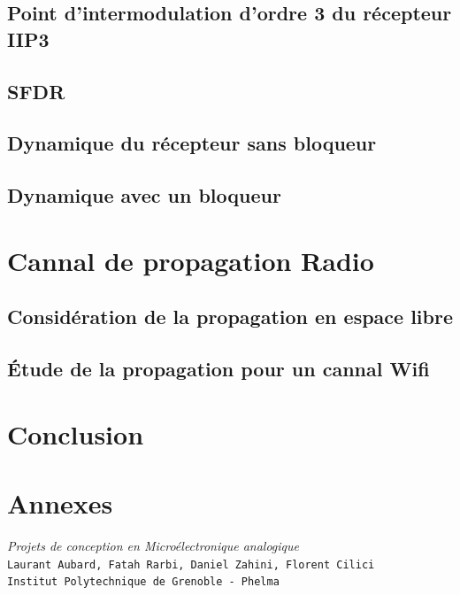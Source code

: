 \documentclass[11pt]{article}
\begin{document}
\subsection{Point d'intermodulation d'ordre 3 du r\'ecepteur IIP3}
\subsection{SFDR}
\subsection{Dynamique du r\'ecepteur sans bloqueur}
\subsection{Dynamique avec un bloqueur}

\section{Cannal de propagation Radio}
\subsection{Consid\'eration de la propagation en espace libre}
\subsection{\'Etude de la propagation pour un cannal Wifi}

\section{Conclusion}

\clearpage
\section{Annexes}


\clearpage


\begin{thebibliography}{9}
\textit{Projets de conception en Micro\'electronique analogique}\\
\texttt{Laurant Aubard, Fatah Rarbi, Daniel Zahini, Florent Cilici}\\
\texttt{Institut Polytechnique de Grenoble - Phelma}

\end{thebibliography}
\end{document}
